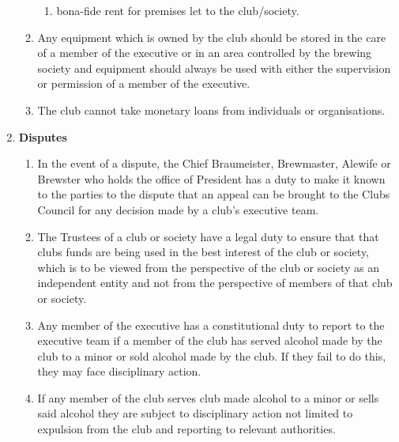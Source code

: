 \documentclass{article}
\begin{document}
\begin{enumerate}[label=\textbf{\arabic*}]
\begin{enumerate}[label=2.\arabic*]
\begin{enumerate}[label=2.7.\arabic*]
            \item bona-fide rent for premises let to the club/society.
        \end{enumerate}
        \item Any equipment which is owned by the club should be stored in the care of a member of the executive or in an area controlled by the brewing society and equipment should always be used with either the supervision or permission of a member of the executive.
        \item The club cannot take monetary loans from individuals or organisations. 
    \end{enumerate}
    
    \item \textbf{Disputes}
    \begin{enumerate}[label=3.\arabic*]
        \item In the event of a dispute, the Chief Braumeister, Brewmaster, Alewife or Brewster who holds the office of President has a duty to make it known to the parties to the dispute that an appeal can be brought to the Clubs Council for any decision made by a club’s executive team.
        \item The Trustees of a club or society have a legal duty to ensure that that clubs funds are being used in the best interest of the club or society, which is to be viewed from the perspective of the club or society as an independent entity and not from the perspective of members of that club or society.
        \item Any member of the executive has a constitutional duty to report to the executive team if a member of the club has served alcohol made by the club to a minor or sold alcohol made by the club. If they fail to do this, they may face disciplinary action.
        \item If any member of the club serves club made alcohol to a minor or sells said alcohol they are subject to disciplinary action not limited to expulsion from the club and reporting to relevant authorities.
    \end{enumerate}
    

\end{enumerate}
\end{document}
